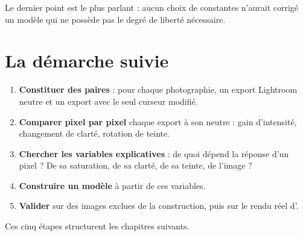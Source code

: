 Le dernier point est le plus parlant : aucun choix de constantes n'aurait
corrigé un modèle qui ne possède pas le degré de liberté nécessaire.


\section{La démarche suivie}
\begin{enumerate}
\item \textbf{Constituer des paires} : pour chaque photographie, un export
Lightroom neutre et un export avec le seul curseur modifié.
\item \textbf{Comparer pixel par pixel} chaque export à son neutre : gain
d'intensité, changement de clarté, rotation de teinte.
\item \textbf{Chercher les variables explicatives} : de quoi dépend la réponse
d'un pixel ? De sa saturation, de sa clarté, de sa teinte, de l'image ?
\item \textbf{Construire un modèle} à partir de ces variables.
\item \textbf{Valider} sur des images exclues de la construction, puis sur le
rendu réel d'\IPR{}.
\end{enumerate}

Ces cinq étapes structurent les chapitres suivants.
